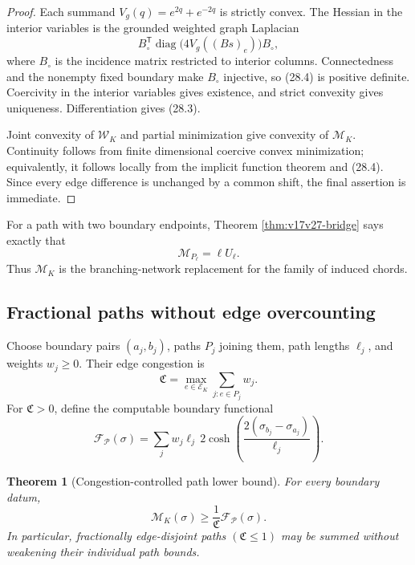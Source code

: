 \documentclass[11pt]{article}
\newtheorem{theorem}{Theorem}[section]
\theoremstyle{remark}
\begin{document}
\begin{proof}
Each summand \(V_g(q)=e^{2q}+e^{-2q}\) is strictly convex.  The Hessian
in the interior variables is the grounded weighted graph Laplacian
\[
 B_\circ^{\mathsf T}
 \operatorname{diag}\bigl(4V_g((Bs)_e)\bigr)B_\circ,             \tag{28.4}
\]
where \(B_\circ\) is the incidence matrix restricted to interior
columns.  Connectedness and the nonempty fixed boundary make
\(B_\circ\) injective, so (28.4) is positive definite.  Coercivity in
the interior variables gives existence, and strict convexity gives
uniqueness.  Differentiation gives (28.3).

Joint convexity of \(\mathcal W_K\) and partial minimization give
convexity of \(\mathcal M_K\).  Continuity follows from finite
dimensional coercive convex minimization; equivalently, it follows
locally from the implicit function theorem and (28.4).  Since every
edge difference is unchanged by a common shift, the final assertion is
immediate.
\end{proof}

For a path with two boundary endpoints, Theorem
\ref{thm:v17v27-bridge} says exactly that
\[
 \mathcal M_{P_\ell}=\ell U_\ell.                 \tag{28.5}
\]
Thus \(\mathcal M_K\) is the branching-network replacement for the
family of induced chords.

\subsection{Fractional paths without edge overcounting}

Choose boundary pairs \((a_j,b_j)\), paths \(P_j\) joining them, path
lengths \(\ell_j\), and weights \(w_j\geq0\).  Their edge congestion is
\[
 \mathfrak C
 =\max_{e\in\mathcal E_K}
 \sum_{j:e\in P_j}w_j.                             \tag{28.6}
\]
For \(\mathfrak C>0\), define the computable boundary functional
\[
 \mathcal F_{\mathcal P}(\sigma)
 =\sum_jw_j\ell_j
 \,2\cosh\left(
 \frac{2(\sigma_{b_j}-\sigma_{a_j})}{\ell_j}
 \right).                                         \tag{28.7}
\]

\begin{theorem}[Congestion-controlled path lower bound]
\label{thm:v17v28-congestion}
For every boundary datum,
\[
 \boxed{
 \mathcal M_K(\sigma)
 \geq\frac{1}{\mathfrak C}
 \mathcal F_{\mathcal P}(\sigma).}                \tag{28.8}
\]
In particular, fractionally edge-disjoint paths
\((\mathfrak C\leq1)\) may be summed without weakening their individual
path bounds.
\end{theorem}
\end{document}
